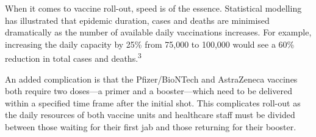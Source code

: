 \documentclass{article}
\begin{document}
When it comes to vaccine roll-out, speed is of the essence. Statistical
modelling has illustrated that epidemic duration, cases and deaths are
minimised dramatically as the number of available daily vaccinations
increases. For example, increasing the daily capacity by 25\% from
75,000 to 100,000 would see a 60\% reduction in total cases and
deaths.\textsuperscript{3}

An added complication is that the Pfizer/BioNTech and AstraZeneca
vaccines both require two doses---a primer and a booster---which need to
be delivered within a specified time frame after the initial shot. This
complicates roll-out as the daily resources of both vaccine units and
healthcare staff must be divided between those waiting for their first
jab and those returning for their booster.

\begin{table}[H]


\end{table}
\end{document}
